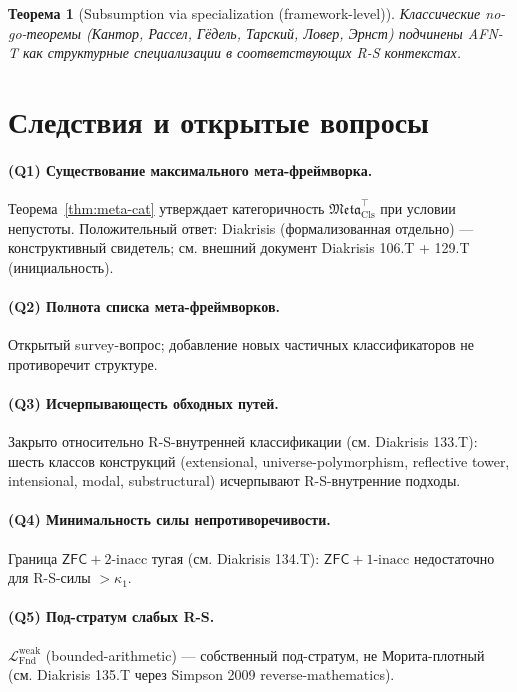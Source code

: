 \documentclass[11pt]{article}
\theoremstyle{plain}
\newtheorem{theorem}{Теорема}[section]
\theoremstyle{definition}
\newcommand{\Meta}{\mathfrak{Meta}}
\newcommand{\LFnd}{\mathcal{L}_{\mathrm{Fnd}}}
\newcommand{\ZFC}{\mathsf{ZFC}}
\begin{document}
\begin{theorem}[Subsumption via specialization (framework-level)]\label{thm:subsumption}
Классические no-go-теоремы (Кантор, Рассел, Гёдель, Тарский, Ловер, Эрнст) подчинены AFN-T как структурные специализации в соответствующих R-S контекстах.
\end{theorem}

\section{Следствия и открытые вопросы}\label{sec:consequences}

\paragraph{(Q1) Существование максимального мета-фреймворка.} Теорема~\ref{thm:meta-cat} утверждает категоричность $\Meta_{\mathrm{Cls}}^{\top}$ при условии непустоты. Положительный ответ: Diakrisis (формализованная отдельно) — конструктивный свидетель; см. внешний документ Diakrisis 106.T + 129.T (инициальность).

\paragraph{(Q2) Полнота списка мета-фреймворков.} Открытый survey-вопрос; добавление новых частичных классификаторов не противоречит структуре.

\paragraph{(Q3) Исчерпывающесть обходных путей.} Закрыто относительно R-S-внутренней классификации (см. Diakrisis 133.T): шесть классов конструкций (extensional, universe-polymorphism, reflective tower, intensional, modal, substructural) исчерпывают R-S-внутренние подходы.

\paragraph{(Q4) Минимальность силы непротиворечивости.} Граница $\ZFC + 2\text{-inacc}$ тугая (см. Diakrisis 134.T): $\ZFC + 1\text{-inacc}$ недостаточно для R-S-силы $> \kappa_1$.

\paragraph{(Q5) Под-стратум слабых R-S.} $\LFnd^\mathrm{weak}$ (bounded-arithmetic) — собственный под-стратум, не Морита-плотный (см. Diakrisis 135.T через Simpson 2009 reverse-mathematics).
\end{document}
